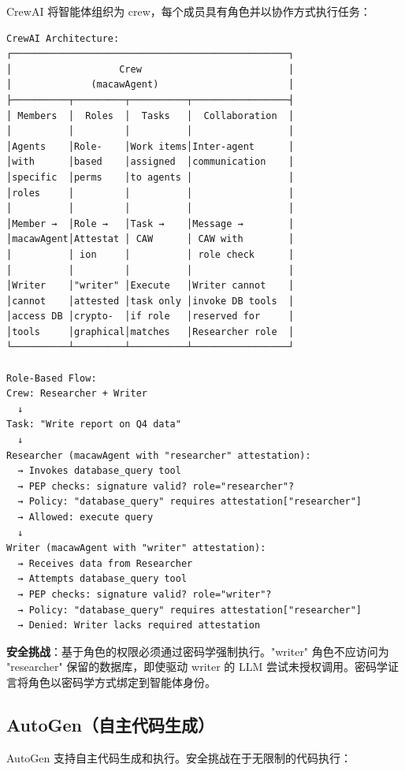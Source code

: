 {CrewAI 将智能体组织为 crew，每个成员具有角色并以协作方式执行任务：

{\tiny
\begin{verbatim}
CrewAI Architecture:
┌─────────────────────────────────────────────────┐
│                   Crew                          │
│              (macawAgent)                       │
├──────────┬─────────┬──────────┬─────────────────┤
│ Members  │  Roles  │  Tasks   │  Collaboration  │
│          │         │          │                 │
│Agents    │Role-    │Work items│Inter-agent      │
│with      │based    │assigned  │communication    │
│specific  │perms    │to agents │                 │
│roles     │         │          │                 │
│          │         │          │                 │
│Member →  │Role →   │Task →    │Message →        │
│macawAgent│Attestat │ CAW      │ CAW with        │
│          │ ion     │          │ role check      │
│          │         │          │                 │
│Writer    │"writer" │Execute   │Writer cannot    │
│cannot    │attested │task only │invoke DB tools  │
│access DB │crypto-  │if role   │reserved for     │
│tools     │graphical│matches   │Researcher role  │
└──────────┴─────────┴──────────┴─────────────────┘

Role-Based Flow:
Crew: Researcher + Writer
  ↓
Task: "Write report on Q4 data"
  ↓
Researcher (macawAgent with "researcher" attestation):
  → Invokes database_query tool
  → PEP checks: signature valid? role="researcher"?
  → Policy: "database_query" requires attestation["researcher"]
  → Allowed: execute query
  ↓
Writer (macawAgent with "writer" attestation):
  → Receives data from Researcher
  → Attempts database_query tool
  → PEP checks: signature valid? role="writer"?
  → Policy: "database_query" requires attestation["researcher"]
  → Denied: Writer lacks required attestation
\end{verbatim}}

\textbf{安全挑战}：基于角色的权限必须通过密码学强制执行。"writer" 角色不应访问为 "researcher" 保留的数据库，即使驱动 writer 的 LLM 尝试未授权调用。密码学证言将角色以密码学方式绑定到智能体身份。

\subsection*{AutoGen（自主代码生成）}

AutoGen 支持自主代码生成和执行。安全挑战在于无限制的代码执行：

}

